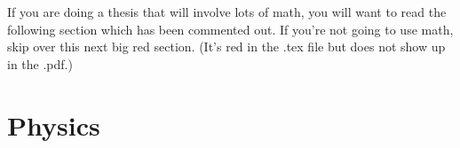\documentclass[12pt,twoside]{reedthesis}
\begin{document}
If you are doing a thesis that will involve lots of math, you will want to read the following section which has been commented out. If you're not going to use math, skip over this next big red section. (It's red in the .tex file but does not show up in the .pdf.)
%	




%



%



%





\section{Physics}
\end{document}
